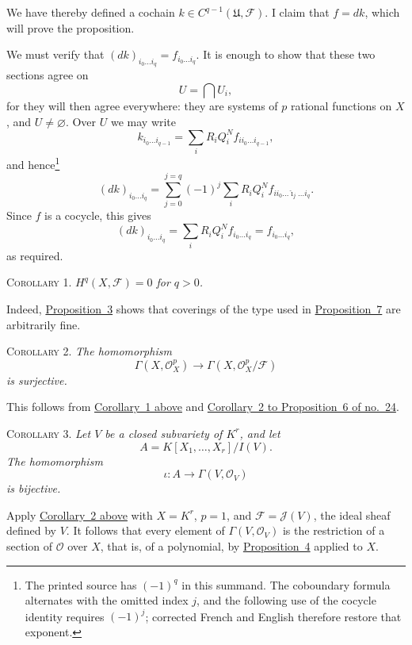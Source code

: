 We have thereby defined a cochain $k\in C^{q-1}(\mathfrak{U},\mathcal{F})$. I claim that $f=dk$, which will prove the proposition.

We must verify that $(dk)_{i_0\ldots i_q}=f_{i_0\ldots i_q}$. It is enough to show that these two sections agree on
\[
U=\bigcap U_i,
\]
for they will then agree everywhere: they are systems of $p$ rational functions on $X$, and $U\neq\varnothing$. Over $U$ we may write
\[
k_{i_0\ldots i_{q-1}}
=\sum_i R_iQ_i^N f_{i i_0\ldots i_{q-1}},
\]
and hence\footnote{The printed source has $(-1)^q$ in this summand. The coboundary formula alternates with the omitted index $j$, and the following use of the cocycle identity requires $(-1)^j$; corrected French and English therefore restore that exponent.}
\[
(dk)_{i_0\ldots i_q}
=\sum_{j=0}^{j=q}(-1)^j
  \sum_i R_iQ_i^N
  f_{i i_0\ldots\widehat{\imath}_j\ldots i_q}.
\]
Since $f$ is a cocycle, this gives
\[
(dk)_{i_0\ldots i_q}
=\sum_i R_iQ_i^N f_{i_0\ldots i_q}
=f_{i_0\ldots i_q},
\]
as required.

\label{fac:II:3:no:44:prop:7:cor:1}
\textsc{Corollary 1.} \textit{$H^q(X,\mathcal{F})=0$ for $q>0$.}

Indeed, \hyperref[fac:II:3:no:42:prop:3]{Proposition~3} shows that coverings of the type used in \hyperref[fac:II:3:no:44:prop:7]{Proposition~7} are arbitrarily fine.

\label{fac:II:3:no:44:prop:7:cor:2}
\textsc{Corollary 2.} \textit{The homomorphism}
\[
\Gamma(X,\mathcal{O}_X^p)
\longrightarrow
\Gamma(X,\mathcal{O}_X^p/\mathcal{F})
\]
\textit{is surjective.}

This follows from \hyperref[fac:II:3:no:44:prop:7:cor:1]{Corollary~1 above} and \hyperref[fac:I:3:no:24:cor:2]{Corollary~2 to Proposition~6 of no.~24}.

\label{fac:II:3:no:44:prop:7:cor:3}
\textsc{Corollary 3.} \textit{Let $V$ be a closed subvariety of $K^r$, and let}
\[
A=K[X_1,\ldots,X_r]/I(V).
\]
\textit{The homomorphism}
\[
\iota:A\longrightarrow\Gamma(V,\mathcal{O}_V)
\]
\textit{is bijective.}

Apply \hyperref[fac:II:3:no:44:prop:7:cor:2]{Corollary~2 above} with $X=K^r$, $p=1$, and $\mathcal{F}=\mathcal{J}(V)$, the ideal sheaf defined by $V$. It follows that every element of $\Gamma(V,\mathcal{O}_V)$ is the restriction of a section of $\mathcal{O}$ over $X$, that is, of a polynomial, by \hyperref[fac:II:3:no:43:prop:4]{Proposition~4} applied to $X$.
